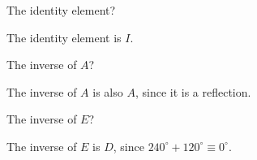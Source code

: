 \documentclass[../gatm_answers.tex]{subfiles}
\begin{document}
\begin{inner_problem}[start=1]
\item The identity element?
\end{inner_problem}

The identity element is $I$.

\begin{inner_problem}
\item The inverse of $A$?
\end{inner_problem}

The inverse of $A$ is also $A$, since it is a reflection.

\begin{inner_problem}
\item The inverse of $E$?
\end{inner_problem}

The inverse of $E$ is $D$, since $240^\circ+120^\circ\equiv 0^\circ$.
\end{document}

